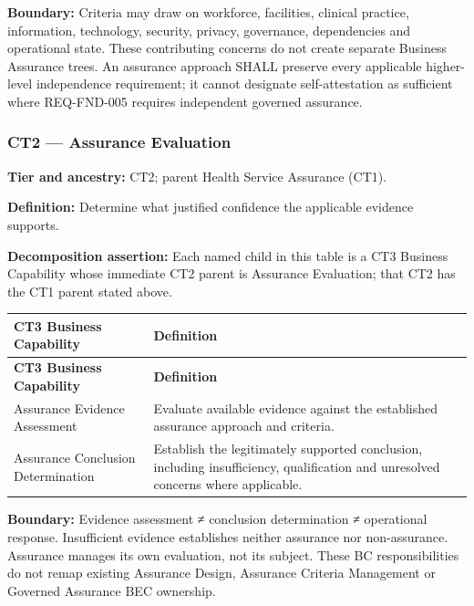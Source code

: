 \textbf{Boundary:} Criteria may draw on workforce, facilities, clinical practice, information, technology, security, privacy, governance, dependencies and operational state. These contributing concerns do not create separate Business Assurance trees. An assurance approach SHALL preserve every applicable higher-level independence requirement; it cannot designate self-attestation as sufficient where REQ-FND-005 requires independent governed assurance.

\label{rad:business:1058}
\subsubsection*{CT2 — Assurance Evaluation}
\label{rad:business:1060}

\textbf{Tier and ancestry:} CT2; parent Health Service Assurance (CT1).

\label{rad:business:1062}

\textbf{Definition:} Determine what justified confidence the applicable evidence supports.

\label{rad:business:1064}

\textbf{Decomposition assertion:} Each named child in this table is a CT3 Business Capability whose immediate CT2 parent is Assurance Evaluation; that CT2 has the CT1 parent stated above.

\label{rad:business:1066}
\begingroup\small\setlength{\TableWidth}{\dimexpr\linewidth-4\tabcolsep-3\arrayrulewidth\relax}
\begin{longtable}{|>{\raggedright\arraybackslash}p{0.35\TableWidth}|>{\raggedright\arraybackslash}p{0.65\TableWidth}|}
\hline\rowcolor{TableHead}\textbf{CT3 Business Capability} & \textbf{Definition}\\\hline\endfirsthead
\hline\rowcolor{TableHead}\textbf{CT3 Business Capability} & \textbf{Definition}\\\hline\endhead
\hline\endfoot
Assurance Evidence Assessment & Evaluate available evidence against the established assurance approach and criteria.\\\hline
Assurance Conclusion Determination & Establish the legitimately supported conclusion, including insufficiency, qualification and unresolved concerns where applicable.\\\hline
\end{longtable}\endgroup
{}\label{rad:business:1071}

\textbf{Boundary:} Evidence assessment ≠ conclusion determination ≠ operational response. Insufficient evidence establishes neither assurance nor non-assurance. Assurance manages its own evaluation, not its subject. These BC responsibilities do not remap existing Assurance Design, Assurance Criteria Management or Governed Assurance BEC ownership.

